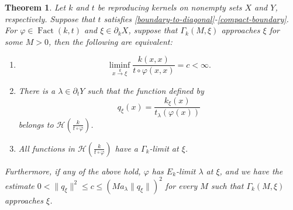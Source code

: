 \documentclass[leqno, final]{article}
\newtheorem{theorem}{Theorem}
\theoremstyle{definition}
\newcommand{\xto}[1]{\stackrel{#1}{\to}}
\newcommand{\Hilbert}{\mathcal{H}}
\newcommand{\rand}{\partial}
\renewcommand{\phi}{\varphi}
\DeclareMathOperator{\Fact}{Fact}
\begin{document}
\begin{theorem}\label{theorem:main}
Let $k$ and $t$ be reproducing kernels on nonempty sets $X$ and $Y$, respectively.
Suppose that $t$ satisfies \ref{boundary-to-diagonal}-\ref{compact-boundary}.
For $\phi\in\Fact(k,t)$ and $\xi\in\rand_kX$, suppose that $\Gamma_k(M,\xi)$
approaches $\xi$ for some $M>0$, then the following are equivalent:
\begin{enumerate}[label=(\roman*)]
\item\label{item:liminf-condition} \[
	\liminf_{x\xto{k}\xi}\frac{k(x,x)}{t\circ\phi(x,x)} = c < \infty.
\]
\item\label{item:kernel-quotient}
There is a $\lambda\in\rand_tY$ such that the function defined by \[
	q_\xi(x) = \frac{k_\xi(x)}{t_\lambda(\phi(x))}
\]
belongs to $\Hilbert(\frac{k}{t\circ\phi})$.
\item\label{item:uniform-boundary-values}
All functions in $\Hilbert(\frac{k}{t\circ\phi})$ have a $\Gamma_k$-limit at $\xi$.
\end{enumerate}
Furthermore, if any of the above hold, $\phi$ has $E_k$-limit $\lambda$ at $\xi$,
and we have the estimate $0<\|q_\xi\|^2\leq c \leq (Ma_\lambda\|q_\xi\|)^2$ for
every $M$ such that $\Gamma_k(M,\xi)$ approaches $\xi$.
\end{theorem}
\end{document}
